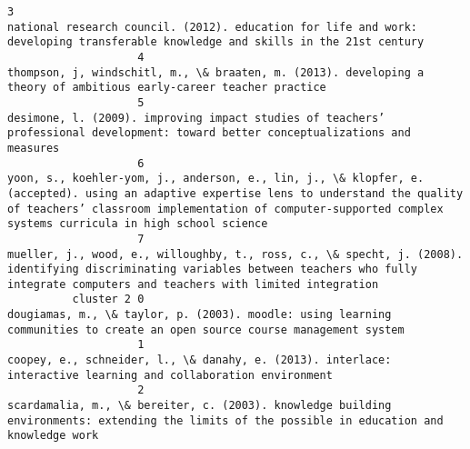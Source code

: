 \documentclass[journal,twocolumn]{IEEEtran}
\begin{document}
\begin{Verbatim}[commandchars=\\\{\}]
                    3                                                                                                                                                                                        national research council. (2012). education for life and work: developing transferable knowledge and skills in the 21st century
                    4                                                                                                                                                                                                       thompson, j, windschitl, m., \& braaten, m. (2013). developing a theory of ambitious early-career teacher practice
                    5                                                                                                                                                                                      desimone, l. (2009). improving impact studies of teachers’ professional development: toward better conceptualizations and measures
                    6                                                                     yoon, s., koehler-yom, j., anderson, e., lin, j., \& klopfer, e. (accepted). using an adaptive expertise lens to understand the quality of teachers’ classroom implementation of computer-supported complex systems curricula in high school science
                    7                                                                                                                         mueller, j., wood, e., willoughby, t., ross, c., \& specht, j. (2008). identifying discriminating variables between teachers who fully integrate computers and teachers with limited integration
          cluster 2 0                                                                                                                                                                                                dougiamas, m., \& taylor, p. (2003). moodle: using learning communities to create an open source course management system
                    1                                                                                                                                                                                                           coopey, e., schneider, l., \& danahy, e. (2013). interlace: interactive learning and collaboration environment
                    2                                                                                                                                                                           scardamalia, m., \& bereiter, c. (2003). knowledge building environments: extending the limits of the possible in education and knowledge work

\end{Verbatim}
\end{document}
